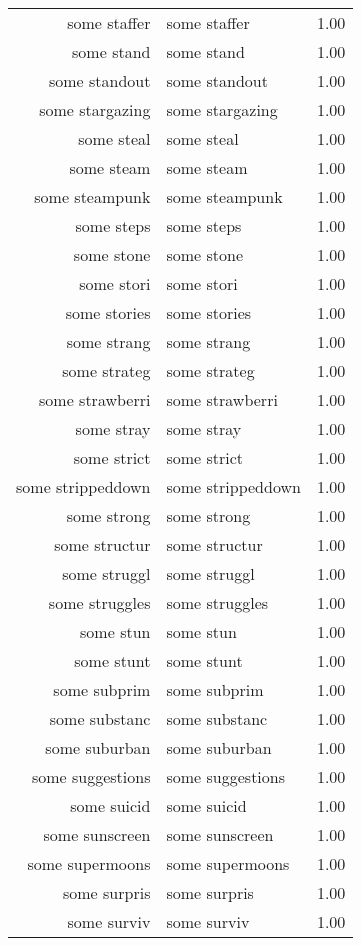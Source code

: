 \begin{table}[ht]
\begin{tabular}{rlr}
  some staffer & some staffer & 1.00 \\ 
  some stand & some stand & 1.00 \\ 
  some standout & some standout & 1.00 \\ 
  some stargazing & some stargazing & 1.00 \\ 
  some steal & some steal & 1.00 \\ 
  some steam & some steam & 1.00 \\ 
  some steampunk & some steampunk & 1.00 \\ 
  some steps & some steps & 1.00 \\ 
  some stone & some stone & 1.00 \\ 
  some stori & some stori & 1.00 \\ 
  some stories & some stories & 1.00 \\ 
  some strang & some strang & 1.00 \\ 
  some strateg & some strateg & 1.00 \\ 
  some strawberri & some strawberri & 1.00 \\ 
  some stray & some stray & 1.00 \\ 
  some strict & some strict & 1.00 \\ 
  some strippeddown & some strippeddown & 1.00 \\ 
  some strong & some strong & 1.00 \\ 
  some structur & some structur & 1.00 \\ 
  some struggl & some struggl & 1.00 \\ 
  some struggles & some struggles & 1.00 \\ 
  some stun & some stun & 1.00 \\ 
  some stunt & some stunt & 1.00 \\ 
  some subprim & some subprim & 1.00 \\ 
  some substanc & some substanc & 1.00 \\ 
  some suburban & some suburban & 1.00 \\ 
  some suggestions & some suggestions & 1.00 \\ 
  some suicid & some suicid & 1.00 \\ 
  some sunscreen & some sunscreen & 1.00 \\ 
  some supermoons & some supermoons & 1.00 \\ 
  some surpris & some surpris & 1.00 \\ 
  some surviv & some surviv & 1.00 \\ 

\end{tabular}
\end{table}
